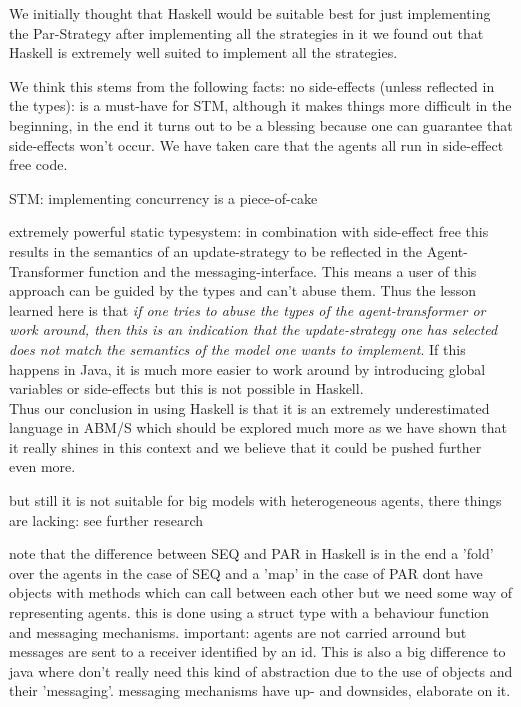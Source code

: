 We initially thought that Haskell would be suitable best for just implementing the Par-Strategy after implementing all the strategies in it we found out that Haskell is extremely well suited to implement all the strategies. 

We think this stems from the following facts: 
no side-effects (unless reflected in the types): is a must-have for STM, although it makes things more difficult in the beginning, in the end it turns out to be a blessing because one can guarantee that side-effects won't occur. We have taken care that the agents all run in side-effect free code.
 
STM: implementing concurrency is a piece-of-cake

extremely powerful static typesystem: in combination with side-effect free this results in the semantics of an update-strategy to be reflected in the Agent-Transformer function and the messaging-interface. This means a user of this approach can be guided by the types and can't abuse them. Thus the lesson learned here is that \textit{if one tries to abuse the types of the agent-transformer or work around, then this is an indication that the update-strategy one has selected does not match the semantics of the model one wants to implement}. If this happens in Java, it is much more easier to work around by introducing global variables or side-effects but this is not possible in Haskell. \\
Thus our conclusion in using Haskell is that it is an extremely underestimated language in ABM/S which should be explored much more as we have shown that it really shines in this context and we believe that it could be pushed further even more.

but still it is not suitable for big models with heterogeneous agents, there things are lacking: see further research




note that the difference between SEQ and PAR in Haskell is in the end a 'fold' over the agents in the case of SEQ and a 'map' in the case of PAR
dont have objects with methods which can call between each other but we need some way of representing agents. this is done using a struct type with a behaviour function and messaging mechanisms. important: agents are not carried arround but messages are sent to a receiver identified by an id. This is also a big difference to java where don't really need this kind of abstraction due to the use of objects and their 'messaging'. messaging mechanisms have up- and downsides, elaborate on it.

